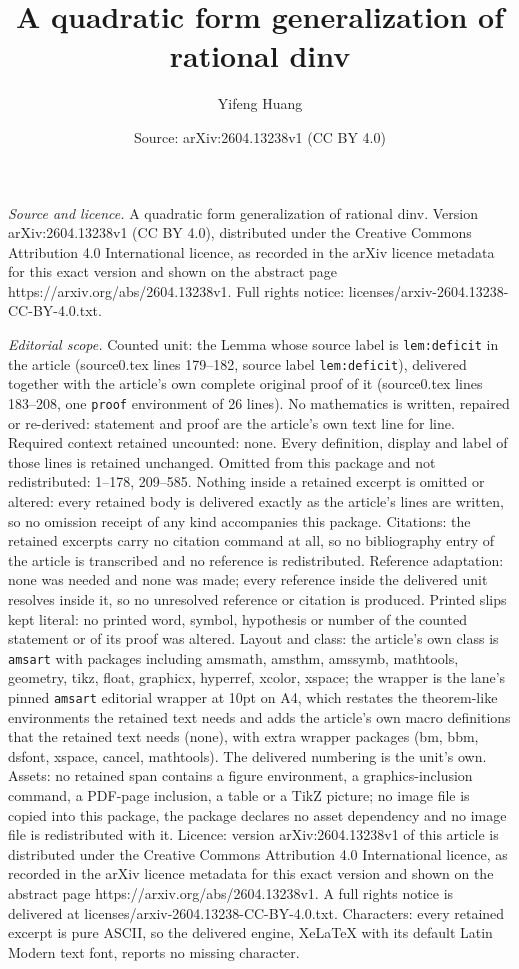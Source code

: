 \documentclass[10pt,a4paper]{amsart}
\title[A quadratic form generalization of rational dinv]{A quadratic form generalization of rational dinv}
\author{Yifeng Huang}
\date{Source: arXiv:2604.13238v1 (CC BY 4.0)}
\begin{document}
\maketitle

\noindent\emph{Source and licence.} A quadratic form generalization of rational dinv. Version arXiv:2604.13238v1 (CC BY 4.0), distributed under the Creative Commons Attribution 4.0 International licence, as recorded in the arXiv licence metadata for this exact version and shown on the abstract page https://arxiv.org/abs/2604.13238v1. Full rights notice: licenses/arxiv-2604.13238-CC-BY-4.0.txt.\par\smallskip

\noindent\textit{Editorial scope.} Counted unit: the Lemma whose source label is \texttt{lem:deficit} in the article (source0.tex lines 179--182, source label \texttt{lem:deficit}), delivered together with the article's own complete original proof of it (source0.tex lines 183--208, one \texttt{proof} environment of 26 lines). No mathematics is written, repaired or re-derived: statement and proof are the article's own text line for line. Required context retained uncounted: none. Every definition, display and label of those lines is retained unchanged. Omitted from this package and not redistributed: 1--178, 209--585. Nothing inside a retained excerpt is omitted or altered: every retained body is delivered exactly as the article's lines are written, so no omission receipt of any kind accompanies this package. Citations: the retained excerpts carry no citation command at all, so no bibliography entry of the article is transcribed and no reference is redistributed. Reference adaptation: none was needed and none was made; every reference inside the delivered unit resolves inside it, so no unresolved reference or citation is produced. Printed slips kept literal: no printed word, symbol, hypothesis or number of the counted statement or of its proof was altered. Layout and class: the article's own class is \texttt{amsart} with packages including amsmath, amsthm, amssymb, mathtools, geometry, tikz, float, graphicx, hyperref, xcolor, xspace; the wrapper is the lane's pinned \texttt{amsart} editorial wrapper at 10pt on A4, which restates the theorem-like environments the retained text needs and adds the article's own macro definitions that the retained text needs (none), with extra wrapper packages (bm, bbm, dsfont, xspace, cancel, mathtools). The delivered numbering is the unit's own. Assets: no retained span contains a figure environment, a graphics-inclusion command, a PDF-page inclusion, a table or a TikZ picture; no image file is copied into this package, the package declares no asset dependency and no image file is redistributed with it. Licence: version arXiv:2604.13238v1 of this article is distributed under the Creative Commons Attribution 4.0 International licence, as recorded in the arXiv licence metadata for this exact version and shown on the abstract page https://arxiv.org/abs/2604.13238v1. A full rights notice is delivered at licenses/arxiv-2604.13238-CC-BY-4.0.txt. Characters: every retained excerpt is pure ASCII, so the delivered engine, XeLaTeX with its default Latin Modern text font, reports no missing character.
\end{document}
